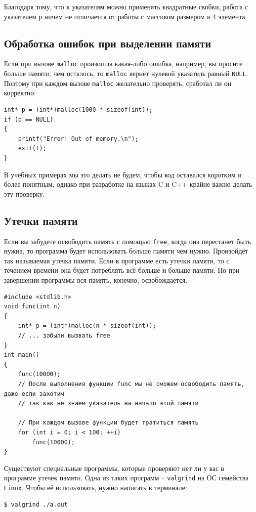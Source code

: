 \documentclass[10pt]{article}
\begin{document}
Благодаря тому, что к указателям можно применять квадратные скобки, работа с указателем \texttt{p} ничем не отличается от работы с массивом размером в 4 элемента.\\


\subsection*{Обработка ошибок при выделении памяти}
Если при вызове \texttt{malloc} произошла какая-либо ошибка, например, вы просите больше памяти, чем осталось, то \texttt{malloc} вернёт нулевой указатель равный \texttt{NULL}. Поэтому при каждом вызове \texttt{malloc} желательно проверять, сработал ли он корректно:
\begin{lstlisting}
int* p = (int*)malloc(1000 * sizeof(int));
if (p == NULL) 
{
    printf("Error! Out of memory.\n");
    exit(1);
}
\end{lstlisting}
В учебных примерах мы это делать не будем, чтобы код оставался коротким и более понятным, однако при разработке на языках C и C++ крайне важно делать эту проверку.

\subsection*{Утечки памяти}
Если вы забудете освободить память с помощью \texttt{free}, когда она перестанет быть нужна, то программа будет использовать больше памяти чем нужно. Произойдёт так называемая утечка памяти. Если в программе есть утечки памяти, то с течением времени она будет потреблять всё больше и больше памяти. Но при завершении программы вся память, конечно, освобождается.
\begin{lstlisting}
#include <stdlib.h>
void func(int n) 
{
    int* p = (int*)malloc(n * sizeof(int));
    // ... забыли вызвать free
}
int main() 
{
    func(10000);
    // После выполнения функции func мы не сможем освободить память, даже если захотим
    // так как не знаем указатель на начало этой памяти
    
    // При каждом вызове функции будет тратиться память
    for (int i = 0; i < 100; ++i)
        func(10000);
}
\end{lstlisting}
Существуют специальные программы, которые проверяют нет ли у вас в программе утечек памяти. Одна из таких программ -- \texttt{valgrind} на ОС семейства \texttt{Linux}. Чтобы её использовать, нужно написать в терминале:
\begin{lstlisting}
$ valgrind ./a.out
\end{lstlisting}
\end{document}
